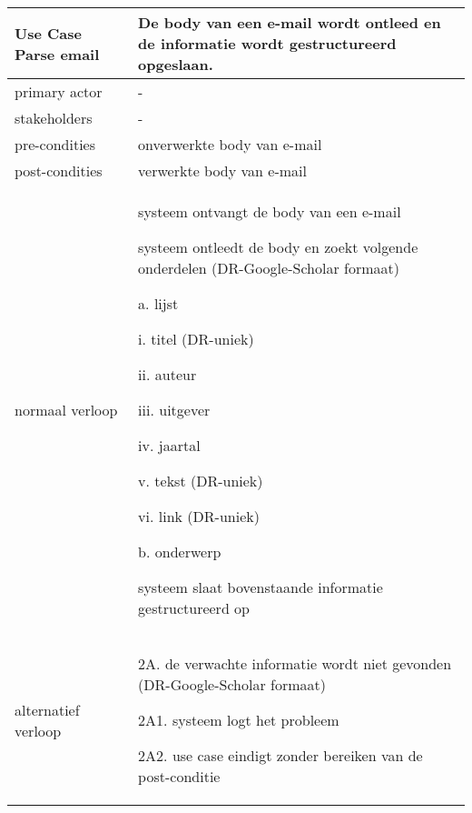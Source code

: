 \begin{table}[ptb]
    \centering
    \begin{tabular}{ | m{5cm} | m{10cm}| } 
        \hline
        \rowcolor{lightgray}
        Use Case Parse email & De body van een e-mail wordt ontleed en de informatie wordt gestructureerd opgeslaan. \\ 
        \hline
        primary actor & - \\ 
        \hline
        stakeholders & - \\ 
        \hline
        pre-condities & onverwerkte body van e-mail \\ 
        \hline
        post-condities & verwerkte body van e-mail \\ 
        \hline
        normaal verloop & 
        \begin{enumerate}
            \item systeem ontvangt de body van een e-mail
            \item systeem ontleedt de body en zoekt volgende onderdelen (DR-Google-Scholar formaat)
            \begin{description}
                \item a. lijst
                \begin{description}
                    \item i. titel (DR-uniek)
                    \item ii. auteur
                    \item iii. uitgever
                    \item iv. jaartal
                    \item v. tekst (DR-uniek)
                    \item vi. link (DR-uniek)
                \end{description}
                \item b. onderwerp
            \end{description}
            \item systeem slaat bovenstaande informatie gestructureerd op
        \end{enumerate} \\ 
        \hline
        alternatief verloop & 
        \begin{description}
            \item 2A. de verwachte informatie wordt niet gevonden (DR-Google-Scholar formaat)
            \item 2A1. systeem logt het probleem
            \item 2A2. use case eindigt zonder bereiken van de post-conditie

\end{description}
\end{tabular}
\end{table}
